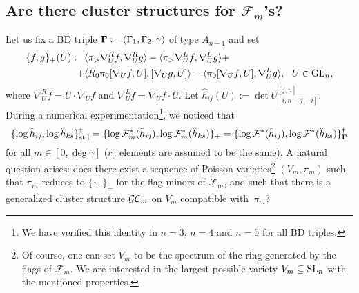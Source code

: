 
\subsection{Are there cluster structures for $\mathcal{F}_m$'s?}
Let us fix a BD triple $\mathbf{\Gamma} := (\Gamma_1,\Gamma_2,\gamma)$ of type $A_{n-1}$ and set
\begin{equation}\begin{split}
    \{f,g\}_{+}(U):= &\langle \pi_{>} \nabla_U^R f,\nabla_U^R g\rangle - \langle \pi_{>} \nabla_U^L f, \nabla_U^L g\rangle   +\\+ &\langle R_0\pi_0[\nabla_U f,U], [\nabla_U g,U]\rangle- \langle \pi_0 [\nabla_U f, U], \nabla_U^L g\rangle,  \ \ U \in \operatorname{GL}_n, 
    \end{split}
\end{equation}
where $\nabla_U^R f = U\cdot \nabla_U f$ and $\nabla_U^L f = \nabla_U f \cdot U$. Let $\hat{h}_{ij}(U):=\det U_{[i,n-j+i]}^{[j,n]}$. During a numerical experimentation\footnote{We have verified this identity in $n=3$, $n=4$ and $n=5$ for all BD triples.}, we noticed that
\[
\{\log \hat{h}_{ij},\log \hat{h}_{ks}\}_{\text{std}}^{\dagger} = \{\log \mathcal{F}_m^*(\hat{h}_{ij}),\log\mathcal{F}_m^*(\hat{h}_{ks})\}_+ = \{\log \mathcal{F}^*(\hat{h}_{ij}),\log\mathcal{F}^*(\hat{h}_{ks})\}_{\mathbf{\Gamma}}^{\dagger}
\]
for all $m \in [0,\deg \gamma]$ ($r_0$ elements are assumed to be the same). A natural question arises: does there exist a sequence of Poisson varieties\footnote{Of course, one can set $V_m$ to be the spectrum of the ring generated by the flags of $\mathcal{F}_m$. We are interested in the largest possible variety $V_m \subseteq \operatorname{SL}_n$ with the mentioned properties.} $(V_m,\pi_{m})$ such that $\pi_m$ reduces to $\{\cdot,\cdot\}_+$ for the flag minors of $\mathcal{F}_m$, and such that there is a generalized cluster structure $\mathcal{GC}_m$ on $V_m$ compatible with~$\pi_m$?


